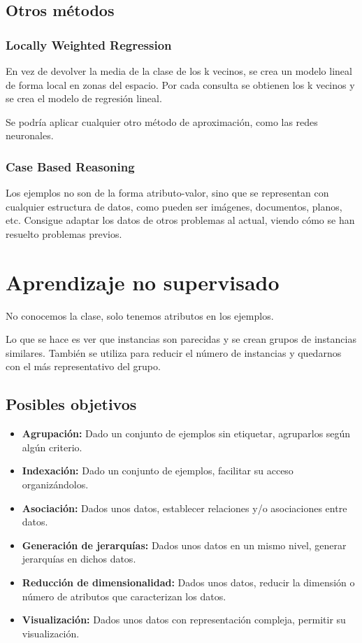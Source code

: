 \documentclass[12pt, twoside, openright]{report} %
\begin{document}
\begin{itemize}
\end{itemize}
\subsection{Otros métodos}
\subsubsection{Locally Weighted Regression}
En vez de devolver la media de la clase de los k vecinos, se crea un modelo lineal de forma local en zonas del espacio. Por cada consulta se obtienen los k vecinos y se crea el modelo de regresión lineal.

Se podría aplicar cualquier otro método de aproximación, como las redes neuronales.
\subsubsection{Case Based Reasoning}
Los ejemplos no son de la forma atributo-valor, sino que se representan con cualquier estructura de datos, como pueden ser imágenes, documentos, planos, etc. Consigue adaptar los datos de otros problemas al actual, viendo cómo se han resuelto problemas previos.

\section{Aprendizaje no supervisado}
No conocemos la clase, solo tenemos atributos en los ejemplos.

Lo que se hace es ver que instancias son parecidas y se crean grupos de instancias similares. También se utiliza para reducir el número de instancias y quedarnos con el más representativo del grupo.

\subsection{Posibles objetivos}
\begin{itemize}
	\item \textbf{Agrupación:} Dado un conjunto de ejemplos sin etiquetar, agruparlos según algún criterio.
	\item \textbf{Indexación:} Dado un conjunto de ejemplos, facilitar su acceso organizándolos.
	\item \textbf{Asociación:} Dados unos datos, establecer relaciones y/o asociaciones entre datos.
	\item \textbf{Generación de jerarquías:} Dados unos datos en un mismo nivel, generar jerarquías en dichos datos.
	\item \textbf{Reducción de dimensionalidad:} Dados unos datos, reducir la dimensión o número de atributos que caracterizan los datos.
	\item \textbf{Visualización:} Dados unos datos con representación compleja, permitir su visualización.
\end{itemize}
\end{document}
